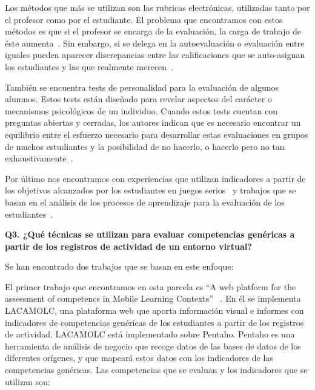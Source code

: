 Los métodos que más se utilizan son las rubricas electrónicas, utilizadas tanto por el profesor como por el estudiante. El problema que encontramos con estos métodos es que si el profesor se encarga de la evaluación, la carga de trabajo de éste aumenta~\cite{lacuesta2009active,barbera2011design}. Sin embargo, si se delega en la autoevaluación o evaluación entre iguales pueden aparecer discrepancias entre las calificaciones que se auto-asignan los estudiantes y las que realmente merecen~\cite{carreras2013promotion}. 

También se encuentra tests de personalidad para la evaluación de algunos alumnos. Estos tests están diseñado para revelar aspectos del carácter o mecanismos psicológicos de un individuo. Cuando estos tests cuentan con preguntas abiertas y cerradas, los autores indican que es necesario encontrar un equilibrio entre el esfuerzo necesario para desarrollar estas evaluaciones en grupos de muchos estudiantes y la posibilidad de no hacerlo, o hacerlo pero no tan exhaustivamente~\cite{vizcarro2013assessment}.

Por último nos encontramos con experiencias que utilizan indicadores a partir de los objetivos alcanzados por los estudiantes en juegos serios~\cite{djaouti2011classifying,bedek2011behavioral} y trabajos que se basan en el análisis de los procesos de aprendizaje para la evaluación de los estudiantes~\cite{rayon2014web,fidalgo:2015}.

\bigskip
\textbf{Q3. ¿Qué técnicas se utilizan para evaluar competencias genéricas a partir de los registros de actividad de un entorno virtual?}

Se han encontrado dos trabajos que se basan en este enfoque:

\bigskip
El primer trabajo que encontramos en esta parcela es “A web platform for the assessment of competencs in Mobile Learning Contexts” ~\cite{rayon2014web}. En él se implementa LACAMOLC, una plataforma web que aporta información visual e informes con indicadores de competencias genéricas de los estudiantes a partir de los registros de actividad. LACAMOLC está implementado sobre Pentaho. Pentaho es una herramienta de análisis de negocio que recoge datos de las bases de datos de los diferentes orígenes, y que mapeará estos datos con los indicadores de las competencias genéricas. Las competencias que se evaluan y los indicadores que se utilizan son:

